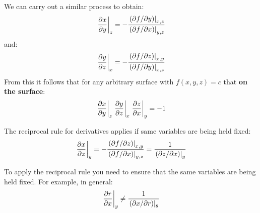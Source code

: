 \documentclass[../main.tex]{subfiles}
\begin{document}
We can carry out a similar process to obtain:
\[
  \at{\pderiv{x}{y}}{z} = -\frac{\at{(\partial f/\partial y)}{x, z}}{\at{(\partial f/\partial x)}{y, z}}
\]
and:
\[
  \at{\pderiv{y}{z}}{x} = -\frac{\at{(\partial f/\partial z)}{x, y}}{\at{(\partial f/\partial y)}{x, z}}
\]
From this it follows that for any arbitrary surface with $f(x, y, z) = c$ that \textbf{on the surface}:
\[
  \at{\pderiv{x}{y}}{z} \at{\pderiv{y}{z}}{x} \at{\pderiv{z}{x}}{y} = -1
\]
\begin{proposition}
The reciprocal rule for derivatives applies if same variables are being held fixed:
\[
  \at{\pderiv{x}{z}}{y} = -\frac{\at{(\partial f/\partial z)}{x, y}}{\at{(\partial f/\partial x)}{y, z}} = \frac{1}{\at{(\partial z/\partial x)}{y}}
\]
\end{proposition}
\begin{remark}[Warning]
  To apply the reciprocal rule you need to ensure that the same variables are being held fixed.
  For example, in general:
  \[
    \at{\pderiv{r}{x}}{y} \neq \frac{1}{\at{(\partial x/\partial r)}{\theta}}
  \]
\end{remark}
\end{document}
